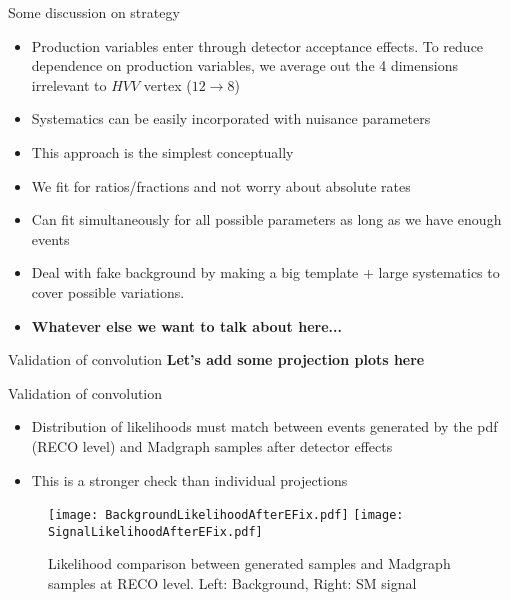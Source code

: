 \documentclass[11pt,t]{beamer}
\begin{document}
\begin{frame}{Some discussion on strategy}
   \begin{itemize}
   \item Production variables enter through detector acceptance effects.  To reduce dependence on
   production variables, we average out the 4 dimensions irrelevant to $HVV$ vertex ($12 \rightarrow 8$)
   \item Systematics can be easily incorporated with nuisance parameters
   \item This approach is the simplest conceptually
   \item We fit for ratios/fractions and not worry about absolute rates
   \item Can fit simultaneously for all possible parameters as long as we have enough events
   \item Deal with fake background by making a big template + large systematics to cover possible variations.
   \item \textbf{Whatever else we want to talk about here...}
   \end{itemize}
\end{frame}

\begin{frame}{Validation of convolution}
   \textbf{Let's add some projection plots here}
\end{frame}

\begin{frame}{Validation of convolution}
   \begin{itemize}
   \item Distribution of likelihoods must match between events generated by the pdf (RECO level)
   and Madgraph samples after detector effects
   \item This is a stronger check than individual projections
   \end{itemize}
   \begin{figure}
   \texttt{[image: BackgroundLikelihoodAfterEFix.pdf]}
   \texttt{[image: SignalLikelihoodAfterEFix.pdf]}
   \caption{Likelihood comparison between generated samples and Madgraph samples at RECO level.
   Left: Background, Right: SM signal}
   \end{figure}
\end{frame}
\end{document}
